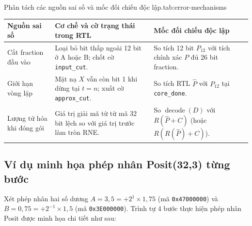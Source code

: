 \begin{engineeringtable}{Phân tách các nguồn sai số và mốc đối chiếu độc lập.}{tab:error-mechanisms}
\begin{tabularx}{\linewidth}{@{}>{\raggedright\arraybackslash}p{32mm}Y Y@{}}
\toprule
Nguồn sai số & Cơ chế và cờ trạng thái trong RTL & Mốc đối chiếu độc lập \\
\midrule
Cắt fraction đầu vào & Loại bỏ bit thấp ngoài 12 bit ở A hoặc B; chốt cờ \texttt{input\_cut}. & So tích 12 bit $P_{12}$ với tích chính xác $P$ đủ 26 bit fraction. \\
Giới hạn vòng lặp & Mặt nạ $X$ vẫn còn bit 1 khi dừng tại $t=n$; xuất cờ \texttt{approx\_cut}. & So tích RTL $\widehat P$ với $P_{12}$ tại \texttt{core\_done}. \\
Lượng tử hóa khi đóng gói & Giá trị giải mã từ từ mã 32 bit lệch so với giá trị trước làm tròn RNE. & So $\operatorname{decode}(D)$ với $R(\widehat P + C)$ (hoặc $R(R(\widehat P)+C)$). \\
\bottomrule
\end{tabularx}
\end{engineeringtable}

\subsection{Ví dụ minh họa phép nhân Posit(32,3) từng bước}

Xét phép nhân hai số dương $A = 3{,}5 = +2^1 \times 1{,}75$ (mã \texttt{0x47000000})
và $B = 0{,}75 = +2^{-1} \times 1{,}5$ (mã \texttt{0x3E000000}). Trình tự 4 bước
thực hiện phép nhân Posit được minh họa chi tiết như sau:

